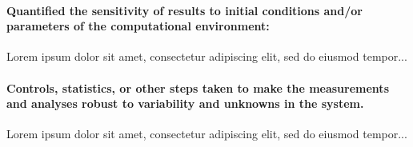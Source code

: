 \documentclass[sigconf,nonacm=true]{acmart}
\begin{document}
\paragraph{Quantified the sensitivity of results to initial conditions and/or parameters of the computational environment:} 
Lorem ipsum dolor sit amet, consectetur adipiscing elit, sed do eiusmod tempor...

\paragraph{Controls, statistics, or other steps taken to make the measurements and analyses robust to variability and unknowns in the system.} 
Lorem ipsum dolor sit amet, consectetur adipiscing elit, sed do eiusmod tempor...
\end{document}
